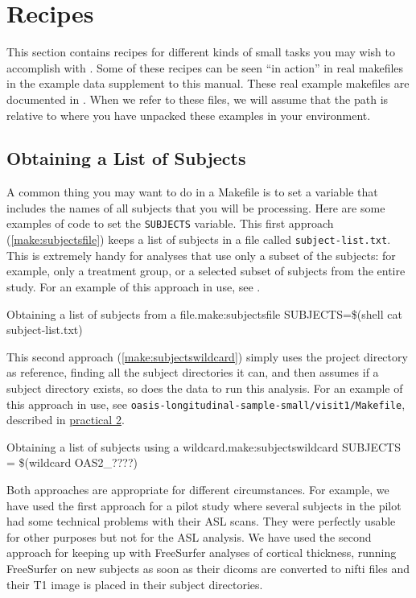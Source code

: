 \chapter{Recipes}
\label{sec:recipes}

This section contains recipes for different kinds of small tasks you may wish to accomplish with \maken{}. Some of these recipes can be seen ``in action'' in real makefiles in the example data supplement to this manual. These real example makefiles are documented in . When we refer to these files, we will assume that the path is relative to where you have unpacked these examples in your environment. 

\section{Obtaining a List of Subjects}
\label{subsec:subjectlist}

A common thing you may want to do in a Makefile is to set a variable that includes the names of all subjects that you will be processing. Here are some examples of code to set the \texttt{SUBJECTS} variable. This first approach (\autoref{make:subjectsfile}) keeps a list of subjects in a file called \texttt{subject-list.txt}. 
This is extremely handy for analyses that use only a subset of the subjects: for example, only a treatment group, or a selected subset of subjects from the entire study. For an example of this approach in use, see . 

\begin{make}{Obtaining a list of subjects from a file.}{make:subjectsfile}
SUBJECTS=\$(shell cat subject-list.txt) 
\end{make}


This second approach (\autoref{make:subjectswildcard}) simply uses the project directory as reference, finding all the subject directories it can, and then assumes if a subject directory exists, so does the data to run this analysis. For an example of this approach in use, see \texttt{oasis-longitudinal-sample-small/visit1/Makefile}, described in \hyperref[practicum2]{practical 2}. 

\begin{make}{Obtaining a list of subjects using a wildcard.}{make:subjectswildcard}
SUBJECTS = \$(wildcard OAS2\_????)
\end{make}

Both approaches are appropriate for different circumstances. For example, we have used the first approach for a pilot study where several subjects in the pilot had some technical problems with their ASL scans. They were perfectly usable for other purposes but not for the ASL analysis. We have used the second approach for keeping up with FreeSurfer analyses of cortical thickness, running FreeSurfer on new subjects as soon as their dicoms are converted to nifti files and their T1 image is placed in their subject directories.  

